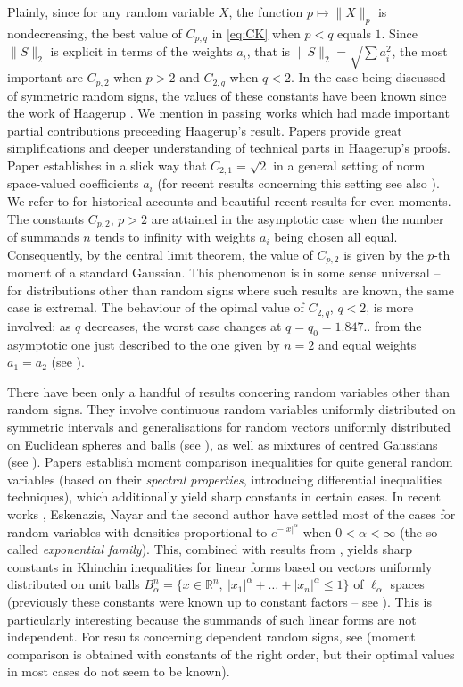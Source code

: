 \documentclass[10pt]{article}
\newcommand{\1}{\textbf{1}}
\newcommand{\R}{\mathbb{R}}
\theoremstyle{remark}
\theoremstyle{definition}
\begin{document}
Plainly, since for any random variable $X$, the function $p \mapsto \|X\|_p$ is nondecreasing, the best value of $C_{p,q}$ in \eqref{eq:CK} when $p < q$ equals $1$. Since $\|S\|_2$ is explicit in terms of the weights $a_i$, that is $\|S\|_2 = \sqrt{\sum a_i^2}$, the most important are $C_{p,2}$ when $p > 2$ and $C_{2,q}$ when $q < 2$. In the case being discussed of symmetric random signs, the values of these constants have been known since the work of Haagerup \cite{Haa}. We mention in passing works \cite{Whi, Eat, Sz} which had made important partial contributions preceeding Haagerup's result. Papers \cite{Mo, NP} provide great simplifications and deeper understanding of technical parts in Haagerup's proofs. Paper \cite{LO-best} establishes in a slick way that $C_{2,1} = \sqrt{2}$ in a general setting of norm space-valued coefficients $a_i$ (for recent results concerning this setting see also \cite{koles-b}). We refer to \cite{NO} for historical accounts and beautiful recent results for even moments. The constants $C_{p,2}$, $p > 2$ are attained in the asymptotic case when the number of summands $n$ tends to infinity with weights $a_i$ being chosen all equal. Consequently, by the central limit theorem, the value of $C_{p,2}$ is given by the $p$-th moment of a standard Gaussian. This phenomenon is in some sense universal -- for distributions other than random signs where such results are known, the same case is extremal. The behaviour of the opimal value of $C_{2,q}$, $q < 2$, is more involved: as $q$ decreases, the worst case changes at $q = q_0 = 1.847..$ from the asymptotic one just described to the one given by $n=2$ and equal weights $a_1 = a_2$ (see \cite{Haa}).

There have been only a handful of results concering random variables other than random signs. They involve continuous random variables uniformly distributed on symmetric intervals and generalisations for random vectors uniformly distributed on Euclidean spheres and balls (see \cite{BC, Kon, KK, LO}), as well as mixtures of centred Gaussians (see \cite{AH, ENT1}). Papers \cite{KLO,koles} establish moment comparison inequalities for quite general random variables (based on their \emph{spectral properties}, introducing differential inequalities techniques), which additionally yield sharp constants in certain cases. In recent works \cite{ENT1, ENT2}, Eskenazis, Nayar and the second author have settled most of the cases for random variables with densities proportional to $e^{-|x|^\alpha}$ when $0 < \alpha < \infty$ (the so-called \emph{exponential family}). This, combined with results from \cite{BGMN}, yields sharp constants in Khinchin inequalities for linear forms based on vectors uniformly distributed on unit balls $B_\alpha^n = \{x \in \R^n, \ |x_1|^\alpha + \ldots + |x_n|^\alpha \leq 1\}$ of $\ell_\alpha$ spaces (previously these constants were known up to constant factors -- see \cite{BGMN}). This is particularly interesting because the summands of such linear forms are not independent. For results concerning dependent random signs, see \cite{PS, Spe} (moment comparison is obtained with constants of the right order, but their optimal values in most cases do not seem to be known).
\end{document}
